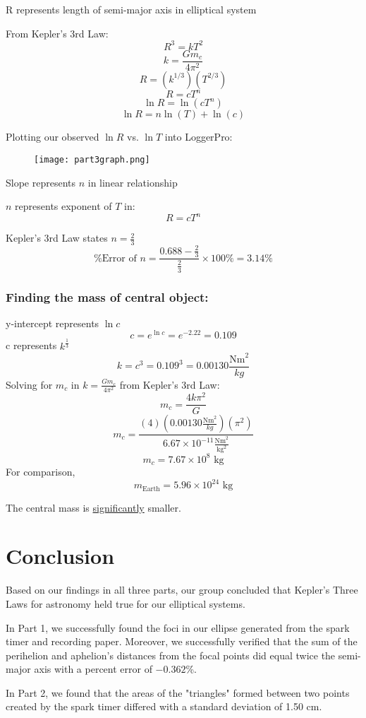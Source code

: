 \documentclass[fleqn]{article}
\begin{document}
R represents length of semi-major axis in elliptical system

From Kepler's 3rd Law:
\[ R^3 = k T^2 \]
\[ k = \frac{Gm_c}{4 \pi ^2}  \]
\[ R = \left(k^{1/3}\right) \left(T ^{2/3}\right) \]
\[ R = cT^n \]
\[ \ln R = \ln \left(cT^n  \right) \]
\[\ln R = n \ln \left( T \right) + \ln \left( c \right) \]

\pagebreak
Plotting our observed $\ln R$ vs. $\ln T$ into LoggerPro:
\begin{figure}[H]
	\texttt{[image: part3graph.png]}
\end{figure}

Slope represents $n$ in linear relationship

$n$ represents exponent of $T$ in:
\[R = cT^n\]

Kepler's 3rd Law states $n=\frac{2}{3} $
\[ \text{\% Error of $n$} = \frac{0.688-\frac{2}{3} }{\frac{2}{3} } \times 100\% = 3.14\%\]

\subsubsection*{Finding the mass of central object:}
y-intercept represents $\ln c $
\[ c = e^{\ln c} = e ^{-2.22} = 0.109 \]
c represents $k^{\frac{1}{3} }$
\[ k = c^3 = 0.109^3 = 0.00130 \frac{\text{Nm}^2 }{kg}  \]
Solving for $m_c$ in $ k = \frac{Gm_c}{4 \pi ^2}  $ from Kepler's 3rd Law:
\[ m_c = \frac{4k \pi ^2}{G}  \]
\[ m_c = \frac{(4)(0.00130 \frac{\text{Nm}^2 }{kg} )(\pi ^2)}{6.67 \times 10^{-11} \frac{\text{Nm}^2 }{\text{kg}^2 }  }  \]
\[ m_c = 7.67 \times 10^8 \text{ kg}  \]
For comparison,
\[ m _{\text{Earth} } = 5.96 \times 10^{24} \text{ kg}  \]

The central mass is \underline{significantly} smaller.
\section*{Conclusion}
Based on our findings in all three parts, our group concluded that Kepler's Three Laws for astronomy held true for our elliptical systems.

In Part 1, we successfully found the foci in our ellipse generated from the spark timer and recording paper. Moreover, we successfully verified that the sum of the perihelion and aphelion's distances from the focal points did equal twice the semi-major axis with a percent error of $-0.362$\%.

In Part 2, we found that the areas of the "triangles" formed between two points created by the spark timer differed with a standard deviation of 1.50 cm.
\end{document}
